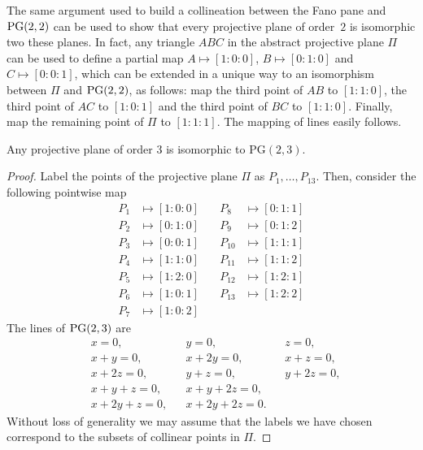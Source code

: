 \begin{rem}\label{rem:order-2=PG(2,2)}
    The same argument used to build a collineation between the Fano pane and $\operatorname{PG}(2,2)$ can be used to show that every projective plane of order~$2$ is isomorphic two these planes. In fact, any triangle $ABC$ in the abstract projective plane $\Pi$ can be used to define a partial map $A\mapsto[1:0:0]$, $B\mapsto[0:1:0]$ and $C\mapsto[0:0:1]$, which can be extended in a unique way to an isomorphism between $\Pi$ and $\operatorname{PG}(2,2)$, as follows: map the third point of $AB$ to $[1:1:0]$, the third point of $AC$ to $[1:0:1]$ and the third point of $BC$ to $[1:1:0]$. Finally, map the remaining point of $\Pi$ to $[1:1:1]$. The mapping of lines easily follows.
\end{rem}

\begin{thm}\label{thm:orde-3=PG(2,3)}
    Any\/ projective\/ plane\/ of\/ order\/ $3$\/ is\/ isomorphic\/ to\/ $\mathrm{PG}(2,3)$.
\end{thm}

\begin{proof}
    Label the points of the projective plane $\Pi$ as $P_1,\dots,P_{13}$. Then, consider the following pointwise map
    \begin{align*}
        P_1 &\mapsto[1:0:0]  &\quad  P_8  &\mapsto[0:1:1] \\
        P_2 &\mapsto[0:1:0]  &\quad  P_9  &\mapsto[0:1:2] \\
        P_3 &\mapsto[0:0:1]  &\quad  P_{10} &\mapsto[1:1:1] \\
        P_4 &\mapsto[1:1:0]  &\quad  P_{11} &\mapsto[1:1:2] \\
        P_5 &\mapsto[1:2:0]  &\quad  P_{12} &\mapsto[1:2:1] \\
        P_6 &\mapsto[1:0:1]  &\quad  P_{13} &\mapsto[1:2:2] \\
        P_7 &\mapsto[1:0:2]
    \end{align*}
    The lines of $\operatorname{PG}(2,3)$ are
    \begin{align*}
        &x = 0, &&y = 0, &&z = 0,\\
        &x + y = 0, &&x + 2y = 0, &&x + z = 0,\\
        &x + 2z = 0, &&y + z = 0, &&y + 2z = 0,\\
        &x + y + z = 0, &&x + y + 2z = 0,\\
        &x + 2y + z = 0, &&x + 2y + 2z = 0.
    \end{align*}
    Without loss of generality we may assume that the labels we have chosen correspond to the subsets of collinear points in $\Pi$.
\end{proof}

